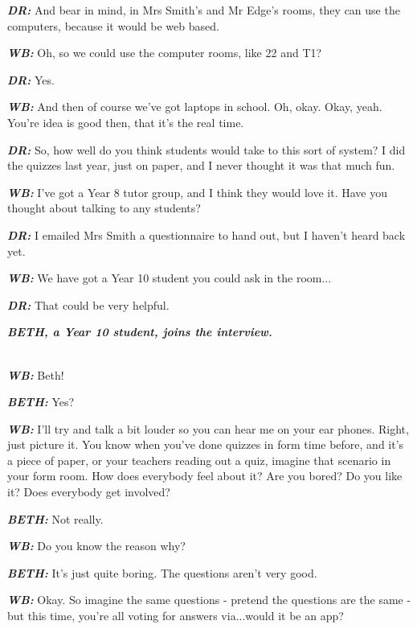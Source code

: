 \textit{\textbf{DR:}} And bear in mind, in Mrs Smith's and Mr Edge's rooms, they can use the computers, because it would be web based.

\textit{\textbf{WB:}} Oh, so we could use the computer rooms, like 22 and T1?

\textit{\textbf{DR:}} Yes.

\textit{\textbf{WB:}} And then of course we've got laptops in school. Oh, okay. Okay, yeah. You're idea is good then, that it's the real time.

\textit{\textbf{DR:}} So, how well do you think students would take to this sort of system? I did the quizzes last year, just on paper, and I never thought it was that much fun.

\textit{\textbf{WB:}} I've got a Year 8 tutor group, and I think they would love it. Have you thought about talking to any students?

\textit{\textbf{DR:}} I emailed Mrs Smith a questionnaire to hand out, but I haven't heard back yet.

\textit{\textbf{WB:}} We have got a Year 10 student you could ask in the room...

\textit{\textbf{DR:}} That could be very helpful.\\

\begin{center}
\textit{\textbf{BETH, a Year 10 student, joins the interview.\\}}
\end{center}

\textit{\textbf{\\WB:}} Beth!

\textit{\textbf{BETH:}} Yes?

\textit{\textbf{WB:}} I'll try and talk a bit louder so you can hear me on your ear phones. Right, just picture it. You know when you've done quizzes in form time before, and it's a piece of paper, or your teachers reading out a quiz, imagine that scenario in your form room. How does everybody feel about it? Are you bored? Do you like it? Does everybody get involved?

\textit{\textbf{BETH:}} Not really.

\textit{\textbf{WB:}} Do you know the reason why?

\textit{\textbf{BETH:}} It's just quite boring. The questions aren't very good.

\textit{\textbf{WB:}} Okay. So imagine the same questions - pretend the questions are the same - but this time, you're all voting for answers via...would it be an app?

